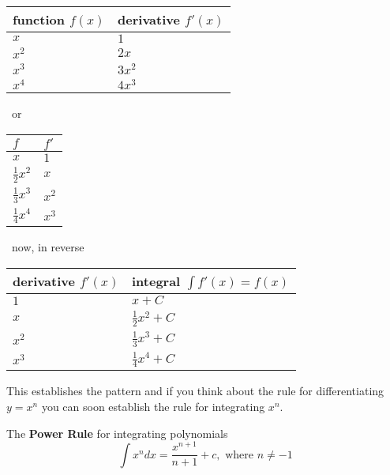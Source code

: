 \begin{center}
\begin{tabular}[c]{p{1.5cm}p{1.5cm}}\toprule
function $f(x)$  & derivative $f'(x)$  \\
\midrule
$x$  & $1$  \\
$x^{2}$  & $2 x$  \\
$x^{3}$  & $3 x^{2}$  \\
$x^{4}$  & $4 x^{3}$  \\
\bottomrule
\end{tabular}\ or
\
\begin{tabular}[c]{ll}\toprule
 $f$  & $f'$  \\
\midrule
$x$  & $1$  \\
$\frac{1}{2} x^{2}$  & $x$  \\
$\frac{1}{3} x^{3}$  & $x^{2}$  \\
$\frac{1}{4} x^{4}$  & $x^{3}$  \\
\bottomrule
\end{tabular}\ now, in reverse \
\begin{tabular}[c]{p{2cm}p{2.5cm}}\toprule
derivative $f'(x)$  &  integral $\int f'(x)=f(x)$  \\\midrule
$1$  & $x +C$  \\
$x$  & $\frac{1}{2} x^{2} +C$  \\
$x^{2}$  & $\frac{1}{3} x^{3} +C$  \\
$x^{3}$  & $\frac{1}{4} x^{4} +C$  \\
\bottomrule
\end{tabular}
\end{center}
\bigskip This establishes the pattern and if you think about the rule for differentiating $y =x^{n}$ you can soon establish the rule for integrating $x^{n}$.
\begin{tcolorbox}
	The \textbf{Power Rule} for integrating polynomials
\[\int x^n dx = \frac{x^{n +1}}{n +1} +c, \text{ where }n \neq  -1
\]
\end{tcolorbox}

